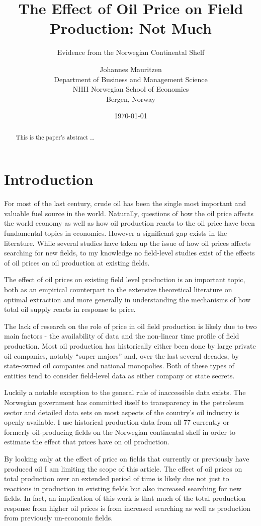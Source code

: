 \documentclass[12pt]{scrartcl} %
\title{The Effect of Oil Price on Field Production: Not Much}
\subtitle{Evidence from the Norwegian Continental Shelf}
\author{
  		Johannes Mauritzen \\
        Department of Business and Management Science\\
        NHH Norwegian School of Economics\\
        Bergen, Norway \\	           
		}
\date{\today}
\begin{document}
\maketitle

\begin{abstract}
This is the paper's abstract \ldots
\end{abstract}




\section{Introduction}

For most of the last century, crude oil has been the single most important and valuable fuel source in the world.  Naturally, questions of how the oil price affects the world economy as well as how oil production reacts to the oil price have been fundamental topics in economics. However a significant gap exists in the literature.  While several studies have taken up the issue of how oil prices affects searching for new fields, to my knowledge no field-level studies exist of the effects of oil prices on oil production at existing fields.  

The effect of oil prices on existing field level production is an important topic, both as an empirical counterpart to the extensive theoretical literature on optimal extraction and more generally in understanding the mechanisms of how total oil supply reacts in response to price.  

The lack of research on the role of price in oil field production is likely due to two main factors - the availability of data and the non-linear time profile of field production.  Most oil production has historically either been done by large private oil companies, notably “super majors” and, over the last several decades, by state-owned oil companies and national monopolies.  Both of these types of entities tend to consider field-level data as either company or state secrets.   

Luckily a notable exception to the general rule of inaccessible data exists.  The Norwegian government has committed itself to transparency in the petroleum sector and detailed data sets on most aspects of the country’s oil industry is openly available.  I use historical production data from all 77 currently or formerly oil-producing fields on the Norwegian continental shelf in order to estimate the effect that prices have on oil production.  

By looking only at the effect of price on fields that currently or previously have produced oil I am limiting the scope of this article.  The effect of oil prices on total production over an extended period of time is likely due not just to reactions in production in existing fields but also increased searching for new fields.  In fact, an implication of this work is that much of the total production response from higher oil prices is from increased searching as well as production from previously un-economic fields.
\end{document}
